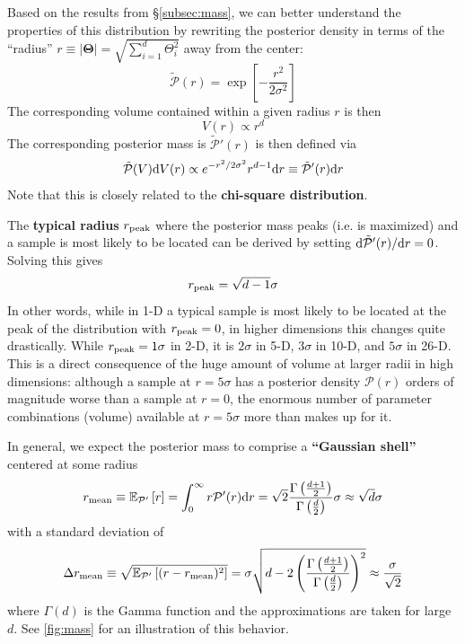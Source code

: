 \documentclass[12pt, titlepage]{article}
\newcommand{\deriv}{\ensuremath{{\rm d}}}  %
\newcommand{\meanwrt}[2]{\ensuremath{\mathbb{E}_{{#2}}\left[{#1}\right]}}
\newcommand{\params}{\ensuremath{\boldsymbol\Theta}}
\newcommand{\posterior}{\ensuremath{\mathcal{P}}}
\begin{document}
Based on the results from \S\ref{subsec:mass}, 
we can better understand the properties of this distribution by
rewriting the posterior density
in terms of the ``radius''
$r \equiv | \params | = \sqrt{\sum_{i=1}^{d} \Theta_i^2}$
away from the center:
\begin{equation}
    \tilde{\posterior}(r) = \exp\left[-\frac{r^2}{2\sigma^2}\right]
\end{equation}
The corresponding volume contained within a given radius $r$ is then
\begin{equation}
    V(r) \propto r^d
\end{equation}
The corresponding posterior mass is $\tilde{\posterior}'(r)$
is then defined via
\begin{align}
    \tilde{\posterior}(V) \deriv V(r)
    \propto e^{-r^2/2\sigma^2} r^{d-1} \deriv r \nonumber
    \equiv \tilde{\posterior}'(r) \deriv r
\end{align}
Note that this is closely related
to the \textbf{chi-square distribution}.

The \textbf{typical radius} $r_{\rm peak}$ 
where the posterior mass peaks (i.e. is maximized)
and a sample is most likely to be located
can be derived by setting $\deriv \tilde{\posterior}'(r)/\deriv r = 0$.
Solving this gives
\begin{equation}
    r_{\rm peak} = \sqrt{d-1} \sigma
\end{equation}
In other words, while in 1-D a typical sample
is most likely to be located at the peak of the 
distribution with $r_{\rm peak} = 0$, in higher dimensions
this changes quite drastically. While $r_{\rm peak} = 1\sigma$
in 2-D, it is $2\sigma$ in 5-D, $3\sigma$ in 10-D, and $5\sigma$
in 26-D. This is a direct consequence of the
huge amount of volume at larger radii in high dimensions:
although a sample at $r=5\sigma$ has a posterior density $\posterior(r)$
orders of magnitude worse than a sample at $r=0$, the enormous number of
parameter combinations (volume) available at $r=5\sigma$
more than makes up for it.

In general, we expect the posterior mass to comprise
a \textbf{``Gaussian shell''} centered at some radius
\begin{equation}
    r_{\rm mean} \equiv \meanwrt{r}{\posterior'}
    = \int_0^\infty r \posterior'(r) \deriv r
    = \sqrt{2} \frac{\Gamma\left(\frac{d+1}{2}\right)}
    {\Gamma\left(\frac{d}{2}\right)} \sigma
    \approx \sqrt{d} \sigma
\end{equation}
with a standard deviation of
\begin{equation}
    \Delta r_{\rm mean}
    \equiv \sqrt{\meanwrt{(r - r_{\rm mean})^2}{\posterior'}}
    = \sigma \sqrt{d - 2 
    \left(\frac{\Gamma\left(\frac{d+1}{2}\right)}
    {\Gamma\left(\frac{d}{2}\right)}\right)^2}
    \approx \frac{\sigma}{\sqrt{2}}
\end{equation}
where $\Gamma(d)$ is the Gamma function and the
approximations are taken for large $d$.
See {\color{red} \autoref{fig:mass}} for an
illustration of this behavior.
\end{document}
